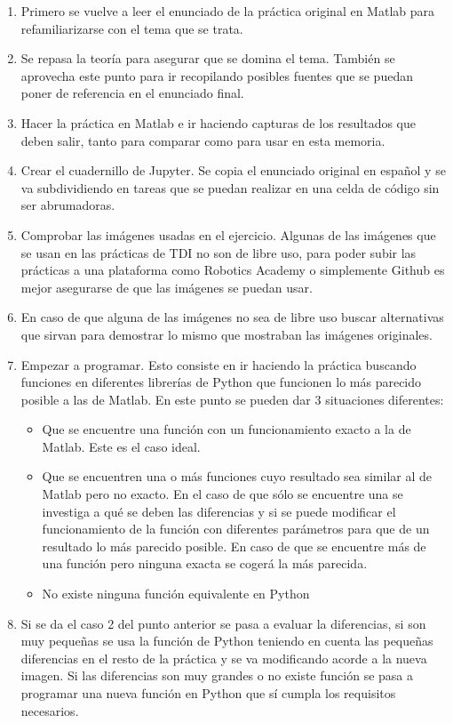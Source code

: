 \begin{enumerate}
    \item Primero se vuelve a leer el enunciado de la práctica original en Matlab para refamiliarizarse con el tema que se trata.
    \item Se repasa la teoría para asegurar que se domina el tema. También se aprovecha este punto para ir recopilando posibles fuentes que se puedan poner de referencia en el enunciado final.
    \item Hacer la práctica en Matlab e ir haciendo capturas de los resultados que deben salir, tanto para comparar como para usar en esta memoria.
    \item Crear el cuadernillo de Jupyter. Se copia el enunciado original en español y se va subdividiendo en tareas que se puedan realizar en una celda de código sin ser abrumadoras.
    \item Comprobar las imágenes usadas en el ejercicio. Algunas de las imágenes que se usan en las prácticas de TDI no son de libre uso, para poder subir las prácticas a una plataforma como Robotics Academy o simplemente Github es mejor asegurarse de que las imágenes se puedan usar.
    \item En caso de que alguna de las imágenes no sea de libre uso buscar alternativas que sirvan para demostrar lo mismo que mostraban las imágenes originales.
    \item Empezar a programar. Esto consiste en ir haciendo la práctica buscando funciones en diferentes librerías de Python que funcionen lo más parecido posible a las de Matlab. En este punto se pueden dar 3 situaciones diferentes:
        \begin{itemize}
            \item Que se encuentre una función con un funcionamiento exacto a la de Matlab. Este es el caso ideal.
            \item Que se encuentren una o más funciones cuyo resultado sea similar al de Matlab pero no exacto. En el caso de que sólo se encuentre una se investiga a qué se deben las diferencias y si se puede modificar el funcionamiento de la función con diferentes parámetros para que de un resultado lo más parecido posible. En caso de que se encuentre más de una función pero ninguna exacta se cogerá la más parecida.
            \item  No existe ninguna función equivalente en Python
        \end{itemize}
    \item Si se da el caso 2 del punto anterior se pasa a evaluar la diferencias, si son muy pequeñas se usa la función de Python teniendo en cuenta las pequeñas diferencias en el resto de la práctica y se va modificando acorde a la nueva imagen. Si las diferencias son muy grandes o no existe función se pasa a programar una nueva función en Python que sí cumpla los requisitos necesarios.

\end{enumerate}
